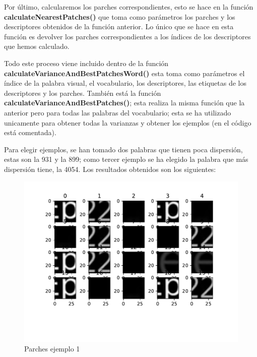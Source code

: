 	\vspace{0.06in}
	Por último, calcularemos los parches correspondientes, esto se hace en la función \textbf{calculateNearestPatches()} que toma como parámetros los parches y los descriptores obtenidos de la función anterior. Lo único que se hace en esta función es devolver los parches correspondientes a los índices de los descriptores que hemos calculado.
	
	\vspace{0.06in}
	Todo este proceso viene incluido dentro de la función \textbf{calculateVarianceAndBestPatchesWord()} esta toma como parámetros el índice de la palabra visual, el vocabulario, los descriptores, las etiquetas de los descriptores y los parches. También está la función \textbf{calculateVarianceAndBestPatches()}; esta realiza la misma función que la anterior pero para todas las palabras del vocabulario; esta se ha utilizado unicamente para obtener todas la varianzas y obtener los ejemplos (en el código está comentada).
	
	\vspace{0.06in}
	Para elegir ejemplos, se han tomado dos palabras que tienen poca dispersión, estas son la 931 y la 899; como tercer ejemplo se ha elegido la palabra que más dispersión tiene, la 4054. Los resultados obtenidos son los siguientes:
	
	\begin{figure}[H]
		\centering
		\includegraphics[scale=0.6]{./imagenes/eje2_1.pdf}
		\caption{Parches ejemplo 1}
		\label{fig:eje2_1}
	\end{figure}

